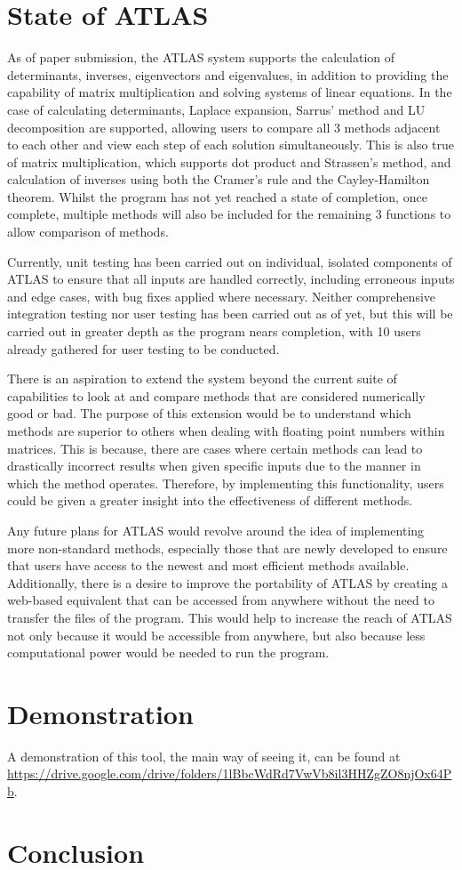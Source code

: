 \documentclass[natbib]{llncs}
\begin{document}
\section{State of ATLAS}
As of paper submission, the ATLAS system supports the calculation of determinants, inverses, eigenvectors and eigenvalues, in addition to providing the capability of matrix multiplication and solving systems of linear equations. In the case of calculating determinants, Laplace expansion, Sarrus' method and LU decomposition are supported, allowing users to compare all 3 methods adjacent to each other and view each step of each solution simultaneously. This is also true of matrix multiplication, which supports dot product and Strassen's method, and calculation of inverses using both the Cramer's rule and the Cayley-Hamilton theorem. Whilst the program has not yet reached a state of completion, once complete, multiple methods will also be included for the remaining 3 functions to allow comparison of methods.

Currently, unit testing has been carried out on individual, isolated components of ATLAS to ensure that all inputs are handled correctly, including erroneous inputs and edge cases, with bug fixes applied where necessary. Neither comprehensive integration testing nor user testing has been carried out as of yet, but this will be carried out in greater depth as the program nears completion, with 10 users already gathered for user testing to be conducted.

There is an aspiration to extend the system beyond the current suite of capabilities to look at and compare methods that are considered numerically good or bad. The purpose of this extension would be to understand which methods are superior to others when dealing with floating point numbers within matrices. This is because, there are cases where certain methods can lead to drastically incorrect results when given specific inputs due to the manner in which the method operates. Therefore, by implementing this functionality, users could be given a greater insight into the effectiveness of different methods.

Any future plans for ATLAS would revolve around the idea of implementing more non-standard methods, especially those that are newly developed to ensure that users have access to the newest and most efficient methods available. Additionally, there is a desire to improve the portability of ATLAS by creating a web-based equivalent that can be accessed from anywhere without the need to transfer the files of the program. This would help to increase the reach of ATLAS not only because it would be accessible from anywhere, but also because less computational power would be needed to run the program.

\section{Demonstration}
A demonstration of this tool, the main way of seeing it, can be found at \hfil\break\url{https://drive.google.com/drive/folders/1lBbcWdRd7VwVb8il3HHZgZO8njOx64Pb}.
\section{Conclusion}
\def\href{\url}\def\path{\url}

\end{document}
